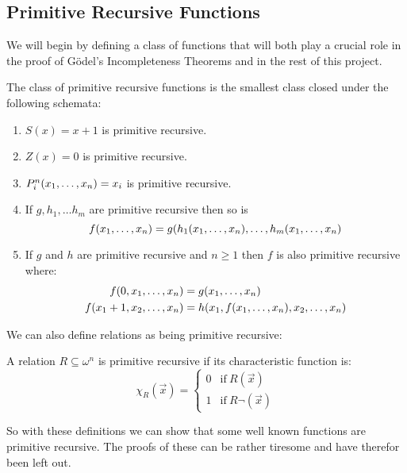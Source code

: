 \documentclass[../main.tex]{subfiles}
\begin{document}
\subsection{Primitive Recursive Functions}
We will begin by defining a class of functions that will both play a crucial
role in the proof of Gödel's Incompleteness Theorems and in the rest of this
project. 
\begin{defi}
	\label{def:Recur}
	The class of primitive recursive functions is the smallest class closed
	under the following schemata:
	\begin{enumerate}[label=\Roman*.]
		\item $S(x)=x+1$ is primitive recursive.
		\item $Z(x)=0$ is primitive recursive.
		\item $P^n_i(x_1,\ldots,x_n)=x_i$ is primitive recursive.
		\item If $g,h_1,\ldots h_m$ are primitive recursive then so
			is
			$$f(x_1,\ldots,x_n)=g(h_1(x_1,\ldots,x_n),\ldots,h_m(x_1,\ldots,x_n)$$
		\item If $g$ and $h$ are primitive recursive and $n\geq 1$ then
			$f$ is also primitive recursive where:
			\begin{align*}
				f(0,x_1,\ldots,x_n)&=g(x_1,\ldots,x_n)\\
				f(x_1+1,x_2,\ldots,x_n)&=h(x_1,f(x_1,\ldots,x_n),x_2,\ldots,x_n)
			\end{align*}
	\end{enumerate}
\end{defi}
We can also define relations as being primitive recursive:
\begin{defi}
	A relation $R\subseteq \omega^n$ is primitive recursive if its
	characteristic function is:
	\[\chi_R(\vec{x})=\begin{cases}
		0 &\text{if}\ R(\vec{x})\\
		1 &\text{if}\ R\neg(\vec x)
	\end{cases}\]
\end{defi}
So with these definitions we can show that some well known functions are
primitive recursive. The proofs of these can be rather tiresome and have
therefor been
left out.
\newpage
\end{document}
